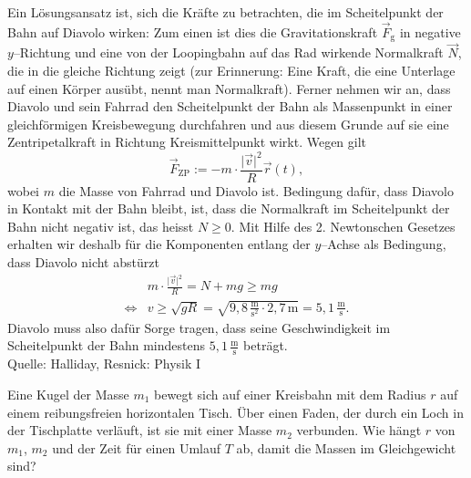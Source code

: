 \begin{MExercises}
\begin{MExercise}
  
  \begin{MSolution}
   Ein L\"osungsansatz ist, sich die Kr\"afte zu betrachten, die im Scheitelpunkt der Bahn auf Diavolo wirken: Zum einen ist dies die Gravitationskraft $\vec{F}_{\textrm{g}}$ in negative $y$--Richtung und eine von der Loopingbahn auf das Rad wirkende Normalkraft $\vec{N}$, die in die gleiche Richtung zeigt (zur Erinnerung: Eine Kraft, die eine Unterlage auf einen K\"orper aus\"ubt, nennt man Normalkraft). Ferner nehmen wir an, dass Diavolo und sein Fahrrad den Scheitelpunkt der Bahn als Massenpunkt in einer gleichf\"ormigen Kreisbewegung durchfahren und aus diesem Grunde auf sie  eine Zentripetalkraft in Richtung Kreismittelpunkt wirkt. Wegen   gilt
   $$
   \vec{F}_{\textrm{ZP}}:=-m\cdot \frac{\vert \vec{v}\vert^2}{R}\vec{r}(t),
   $$
   wobei $m$ die Masse von Fahrrad und Diavolo ist. Bedingung daf\"ur, dass Diavolo in Kontakt mit der Bahn bleibt, ist, dass die Normalkraft im Scheitelpunkt der Bahn nicht negativ ist, das heisst $N\geq 0$. Mit Hilfe des 2. Newtonschen Gesetzes erhalten wir deshalb f\"ur die Komponenten entlang der $y$--Achse als Bedingung, dass Diavolo nicht abst\"urzt
  \begin{eqnarray*}
  &m\cdot \frac{\vert \vec{v}\vert^2}{R}= N+mg\ge mg\\
  \Leftrightarrow &v\ge\sqrt{gR}=\sqrt{9{,}8\,\frac{\text{m}}{\text{s}^2}\cdot 2{,}7\,\text{m}}=5{,}1\,\frac{\text{m}}{\text{s}}.
  \end{eqnarray*}
  Diavolo muss also daf\"ur Sorge tragen, dass seine Geschwindigkeit im Scheitelpunkt der Bahn mindestens $5{,}1\,\frac{\text{m}}{\text{s}}$ betr\"agt.\\
  
  Quelle: Halliday, Resnick: Physik I
  
  \end{MSolution}
  \end{MExercise}
  
  \begin{MExercise}
  Eine Kugel der Masse $m_1$ bewegt sich auf einer Kreisbahn mit dem Radius $r$ auf einem reibungsfreien horizontalen Tisch. \"Uber einen Faden, der durch ein Loch in der Tischplatte verl\"auft, ist sie mit einer Masse $m_2$ verbunden. Wie h\"angt $r$ von $m_1$, $m_2$ und der Zeit f\"ur einen Umlauf $T$ ab, damit die Massen im Gleichgewicht sind?
  

\end{MExercise}
\end{MExercises}
